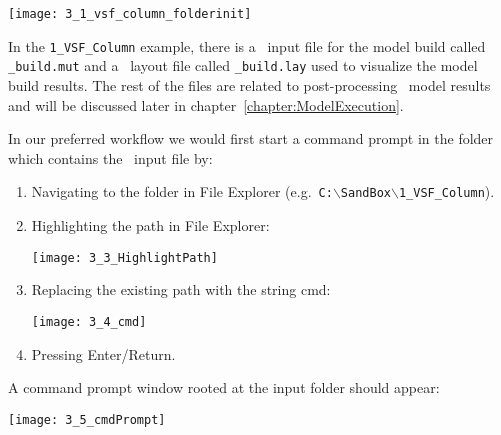     \texttt{[image: 3\_1\_vsf\_column\_folderinit]}

In the \texttt{1\_VSF\_Column} example, there is a \mut\ input file for the model build called \texttt{\_build.mut} and a \tecplot\ layout file called \texttt{\_build.lay} used to visualize the model build results.  The rest of the files are related to post-processing \mfus\ model results and will be discussed later in chapter~\ref{chapter:ModelExecution}.
 
 In our preferred workflow we would first start a command prompt in the folder which contains the \mut\ input file by:
\begin{enumerate}
   \item  Navigating to the folder in File Explorer (e.g.\ \texttt{C:$\backslash$SandBox$\backslash$1\_VSF\_Column}).
   \item  Highlighting the path in File Explorer:

        \texttt{[image: 3\_3\_HighlightPath]}

    \item  Replacing the existing path with the string {\sf cmd}:

        \texttt{[image: 3\_4\_cmd]}

    \item Pressing Enter/Return.
\end{enumerate}
A command prompt window rooted at the input folder should appear:

        \texttt{[image: 3\_5\_cmdPrompt]}



